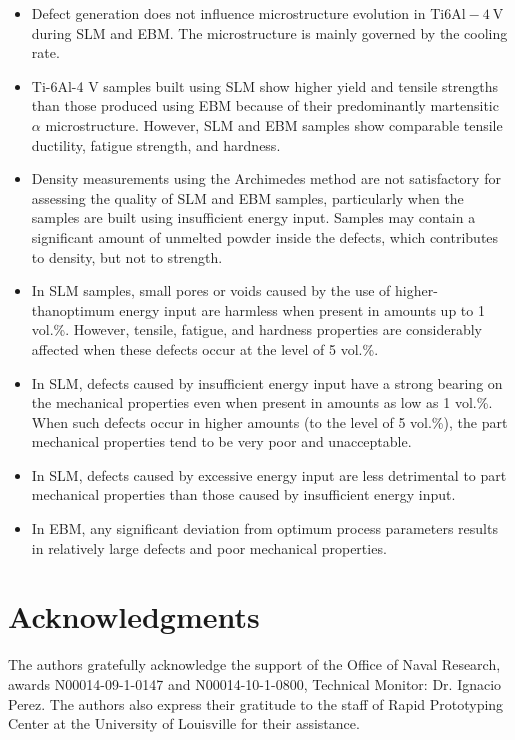 \documentclass[10pt]{article}
\begin{document}
\begin{itemize}
  \item Defect generation does not influence microstructure evolution in Ti$6 \mathrm{Al}-4 \mathrm{~V}$ during SLM and EBM. The microstructure is mainly governed by the cooling rate.

  \item Ti-6Al-4 V samples built using SLM show higher yield and tensile strengths than those produced using EBM because of their predominantly martensitic $\alpha$ microstructure. However, SLM and EBM samples show comparable tensile ductility, fatigue strength, and hardness.

  \item Density measurements using the Archimedes method are not satisfactory for assessing the quality of SLM and EBM samples, particularly when the samples are built using insufficient energy input. Samples may contain a significant amount of unmelted powder inside the defects, which contributes to density, but not to strength.

  \item In SLM samples, small pores or voids caused by the use of higher-thanoptimum energy input are harmless when present in amounts up to 1 vol.\%. However, tensile, fatigue, and hardness properties are considerably affected when these defects occur at the level of 5 vol.\%.

  \item In SLM, defects caused by insufficient energy input have a strong bearing on the mechanical properties even when present in amounts as low as 1 vol.\%. When such defects occur in higher amounts (to the level of 5 vol.\%), the part mechanical properties tend to be very poor and unacceptable.

  \item In SLM, defects caused by excessive energy input are less detrimental to part mechanical properties than those caused by insufficient energy input.

  \item In EBM, any significant deviation from optimum process parameters results in relatively large defects and poor mechanical properties.

\end{itemize}

\section*{Acknowledgments}
The authors gratefully acknowledge the support of the Office of Naval Research, awards N00014-09-1-0147 and N00014-10-1-0800, Technical Monitor: Dr. Ignacio Perez. The authors also express their gratitude to the staff of Rapid Prototyping Center at the University of Louisville for their assistance.
\end{document}
